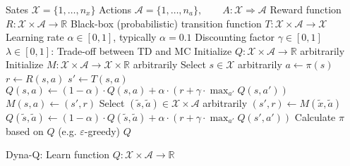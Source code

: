\documentclass{article}
\begin{document}
\begin{preview}
    \begin{algorithm}[H]
        \begin{algorithmic}
        \Require
        \Statex Sates $\mathcal{X} = \{1, \dots, n_x\}$
        \Statex Actions $\mathcal{A} = \{1, \dots, n_a\},\qquad A: \mathcal{X} \Rightarrow \mathcal{A}$
        \Statex Reward function $R: \mathcal{X} \times \mathcal{A} \rightarrow \mathbb{R}$
        \Statex Black-box (probabilistic) transition function $T: \mathcal{X} \times \mathcal{A} \rightarrow \mathcal{X}$
        \Statex Learning rate $\alpha \in [0, 1]$, typically $\alpha = 0.1$
        \Statex Discounting factor $\gamma \in [0, 1]$
        \Statex $\lambda \in [0, 1]$: Trade-off between TD and MC
            \State Initialize $Q: \mathcal{X} \times \mathcal{A} \rightarrow \mathbb{R}$ arbitrarily
            \State Initialize $M: \mathcal{X} \times \mathcal{A} \rightarrow \mathcal{X} \times \mathbb{R}$ arbitrarily 
                \State Select $s \in \mathcal{X}$ arbitrarily
                \State $a \gets \pi(s)$
                \State $r \gets R(s, a)$
                \State $s' \gets T(s, a)$ 
                \State $Q(s, a) \gets (1 - \alpha) \cdot Q(s, a) + \alpha \cdot (r + \gamma \cdot \max_{a'} Q(s, a'))$
                \State $M(s, a) \gets (s', r)$
                    \State Select $(\tilde{s}, \tilde{a}) \in \mathcal{X} \times \mathcal{A}$ arbitrarily
                    \State $(s', r) \gets M(\tilde{x}, \tilde{a})$
                    \State $Q(\tilde{s}, \tilde{a}) \gets (1 - \alpha) \cdot Q(\tilde{s}, \tilde{a}) + \alpha \cdot (r + \gamma \cdot \max_{a'} Q(s', a'))$
                \EndFor
                \State Calculate $\pi$ based on $Q$ (e.g. $\varepsilon$-greedy)
            \EndWhile
            \Return $Q$
        \EndProcedure
        \end{algorithmic}
    \caption{Dyna-Q: Learn function $Q: \mathcal{X} \times \mathcal{A} \rightarrow \mathbb{R}$}
    \label{alg:dyna-q}
    \end{algorithm}
\end{preview}
\end{document}
